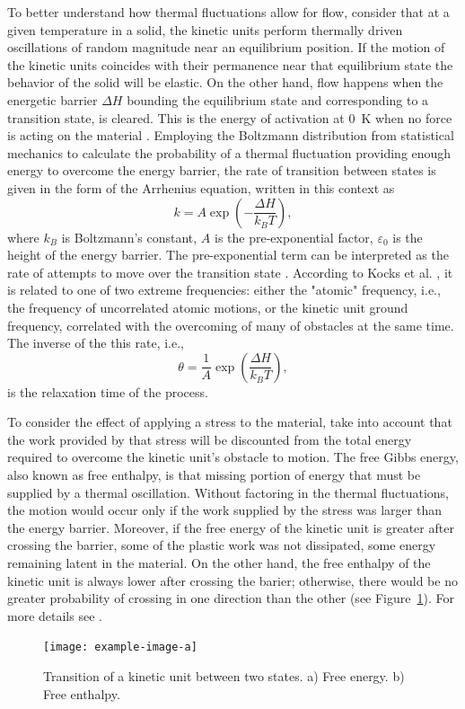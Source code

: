 To better understand how thermal fluctuations allow for flow, consider that at a given temperature in a solid, the kinetic units perform thermally driven oscillations of random magnitude near an equilibrium position.
If the motion of the kinetic units coincides with their permanence near that equilibrium state the behavior of the solid will be elastic.
On the other hand, flow happens when the energetic barrier $\Delta H$ bounding the equilibrium state and corresponding to a transition state, is cleared.
This is the energy of activation at \SI{0}{\kelvin} when no force is acting on the material \citep{kocks1975thermodynamics}.
Employing the Boltzmann distribution from statistical mechanics to calculate the probability of a thermal fluctuation providing enough energy to overcome the energy barrier, the rate of transition between states is given in the form of the Arrhenius equation, written in this context as
\begin{equation}
	k = A\exp\left(-\frac{\Delta H}{k_BT}\right),
\end{equation}
where $k_B$ is Boltzmann's constant, $A$ is the pre-exponential factor, $\varepsilon_0$ is the height of the energy barrier.
The pre-exponential term can be interpreted as the rate of attempts to move over the transition state \citep{atkins2010atkins}.
According to Kocks et al. \citep{kocks1975thermodynamics}, it is related to one of two extreme frequencies: either the "atomic" frequency, i.e., the frequency of uncorrelated atomic motions, or the kinetic unit ground frequency, correlated with the overcoming of many of obstacles at the same time.
The inverse of the this rate, i.e.,
\begin{equation}
	\theta = \frac{1}{A}\exp\left(\frac{\Delta H}{k_B T}\right),
\end{equation}
is the relaxation time of the process.

To consider the effect of applying a stress to the material, take into account that the work provided by that stress will be discounted from the total energy required to overcome the kinetic unit's obstacle to motion.
The free Gibbs energy, also known as free enthalpy, is that missing portion of energy that must be supplied by a thermal oscillation.
Without factoring in the thermal fluctuations, the motion would occur only if the work supplied by the stress was larger than the energy barrier.
Moreover, if the free energy of the kinetic unit is greater after crossing the barrier, some of the plastic work was not dissipated, some energy remaining latent in the material.
On the other hand, the free enthalpy of the kinetic unit is always lower after crossing the barier; otherwise, there would be no greater probability of crossing in one direction than the other (see Figure~\ref{fig:site_model_theory}).
For more details see \cite{kocks1975thermodynamics}.
\begin{figure}
	\centering
	\texttt{[image: example-image-a]}
	\caption{Transition of a kinetic unit between two states. a) Free energy. b) Free enthalpy.}
\label{fig:site_model_theory}
\end{figure}

